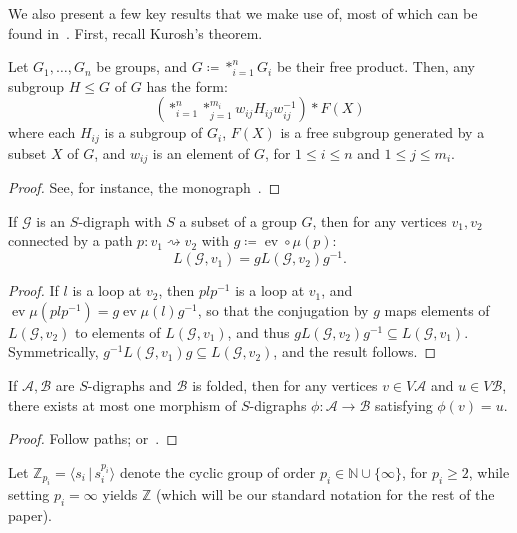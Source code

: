 \documentclass[ALCO,ThmDefs,Unicode,epreuves]{cedram}
\newcommand{\ZZ}{\mathbb{Z}}
\newcommand{\cG}{\mathcal{G}}
\newcommand{\cA}{\mathcal{A}}
\newcommand{\cB}{\mathcal{B}}
\DeclareMathOperator{\ev}{ev}
\begin{document}
We also present a few key results that we make use of, most of which can be found in~\cite{KM, St, We}. First, recall Kurosh's theorem.

\begin{theo}
 Let $G_{1}, \dots, G_n$ be groups, and $G \coloneqq *_{i=1}^n G_i$ be their free product.
 Then, any subgroup $H \leq G$ of $G$ has the form:
 \[
 (*_{i=1}^n*_{j=1}^{m_i} w_{ij}H_{ij}w_{ij}^{-1} )* F(X)
 \]
 where each $H_{ij}$ is a subgroup of $G_i$, $F(X)$ is a free subgroup generated by a subset $X$ of $G$, and $w_{ij}$ is an element of $G$, for $1\leq i\leq n$ and $1\leq j\leq m_i$.
\end{theo}
\begin{proof}
 See, for instance, the monograph~\cite[pp.~56--57]{Se}.
\end{proof}

\begin{lemm}[{\cite[Lemma~7.5]{KM}}]\label{lemma:basepoint-conjugate}
If $\mathcal{G}$ is an $S$-digraph with $S$ a subset of a group $G$, then for any vertices $v_{1},v_{2}$ connected by a path $p:v_{1} \rightsquigarrow v_{2}$ with $g\coloneqq \ev \circ {\mu}(p)$:
 \[
 L(\mathcal{G},v_{1}) = gL(\mathcal{G},v_{2})g^{-1}.
 \]
\end{lemm}
\begin{proof}
If $l$ is a loop at $v_{2}$, then $plp^{-1}$ is a loop at $v_{1}$, and $\ev{\mu}(plp^{-1}) = g\ev{\mu}(l)g^{-1}$, so that the conjugation by $g$ maps elements of $L(\cG,v_{2})$ to elements of $L(\cG,v_{1})$, and thus $gL(\cG,v_{2})g^{-1} \subseteq L(\cG,v_{1})$. Symmetrically, $g^{-1}L(\cG,v_{1})g \subseteq L(\cG,v_{2})$, and the result follows.
\end{proof}

\begin{lemm}[{\cite[Lemma~4.2]{KM}}]
If $\cA,\cB$ are $S$-digraphs and $\cB$ is folded, then for any vertices $v\in V\cA$ and $u\in V\cB$, there exists at most one morphism of $S$-digraphs ${\phi}:\cA\to \cB$ satisfying ${\phi}(v)=u$. 
\end{lemm}
\begin{proof}
Follow paths; %
\cf \cite[Lemma~4.2]{KM} or~\cite[5.1~(c)]{St}.
\end{proof}

Let $\ZZ_{p_i} = \langle s_i\, |\, s_i^{p_i} \rangle$ denote the cyclic group of order $p_i \in \mathbb{N} \cup \{\infty\}$, for $p_i\geq 2$, while setting $p_i = \infty$ yields $\ZZ$ (which will be our standard notation for the rest of the paper).
\end{document}
